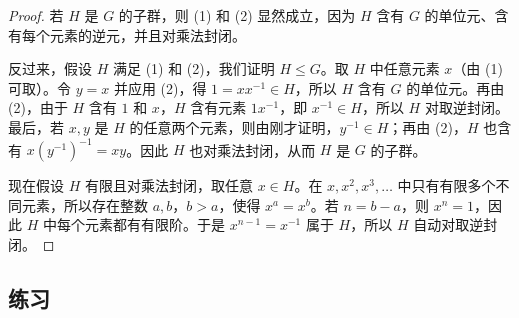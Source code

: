 \begin{proof}
若 $H$ 是 $G$ 的子群，则 (1) 和 (2) 显然成立，因为 $H$ 含有 $G$ 的单位元、含有每个元素的逆元，并且对乘法封闭。

反过来，假设 $H$ 满足 (1) 和 (2)，我们证明 $H\leq G$。取 $H$ 中任意元素 $x$（由 (1) 可取）。令 $y=x$ 并应用 (2)，得 $1=xx^{-1}\in H$，所以 $H$ 含有 $G$ 的单位元。再由 (2)，由于 $H$ 含有 $1$ 和 $x$，$H$ 含有元素 $1x^{-1}$，即 $x^{-1}\in H$，所以 $H$ 对取逆封闭。最后，若 $x,y$ 是 $H$ 的任意两个元素，则由刚才证明，$y^{-1}\in H$；再由 (2)，$H$ 也含有 $x(y^{-1})^{-1}=xy$。因此 $H$ 也对乘法封闭，从而 $H$ 是 $G$ 的子群。

现在假设 $H$ 有限且对乘法封闭，取任意 $x\in H$。在 $x,x^2,x^3,\ldots$ 中只有有限多个不同元素，所以存在整数 $a,b$，$b>a$，使得 $x^a=x^b$。若 $n=b-a$，则 $x^n=1$，因此 $H$ 中每个元素都有有限阶。于是 $x^{n-1}=x^{-1}$ 属于 $H$，所以 $H$ 自动对取逆封闭。
\end{proof}

\subsection*{练习}

